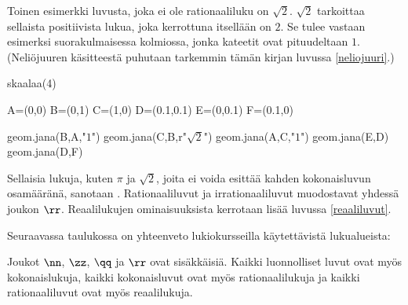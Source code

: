 Toinen esimerkki luvusta, joka ei ole rationaaliluku on $\sqrt{2}$. $\sqrt{2}$ tarkoittaa sellaista positiivista lukua, joka kerrottuna itsellään on $2$. Se tulee vastaan esimerksi suorakulmaisessa kolmiossa, jonka kateetit ovat pituudeltaan $1$. (Neliöjuuren käsitteestä puhutaan tarkemmin tämän kirjan luvussa \ref{neliojuuri}.)

\begin{kuva}
	skaalaa(4)

	A=(0,0)
	B=(0,1)
	C=(1,0)
	D=(0.1,0.1)
	E=(0,0.1)
	F=(0.1,0)

	geom.jana(B,A,"$1$")
	geom.jana(C,B,r"$\sqrt{2}$")
	geom.jana(A,C,"$1$")
	geom.jana(E,D)
	geom.jana(D,F)
\end{kuva}

Sellaisia lukuja, kuten $\pi$ ja $\sqrt{2}$, joita ei voida esittää kahden kokonaisluvun osamääränä, sanotaan . Rationaaliluvut ja irrationaaliluvut muodostavat yhdessä  joukon $\rr$. Reaalilukujen ominaisuuksista kerrotaan lisää luvussa \ref{reaaliluvut}.

Seuraavassa taulukossa on yhteenveto lukiokursseilla käytettävistä lukualueista:

Joukot $\nn$, $\zz$, $\qq$ ja $\rr$ ovat sisäkkäisiä. Kaikki luonnolliset luvut ovat myös kokonaislukuja, kaikki kokonaisluvut ovat myös rationaalilukuja ja kaikki rationaaliluvut ovat myös reaalilukuja.

